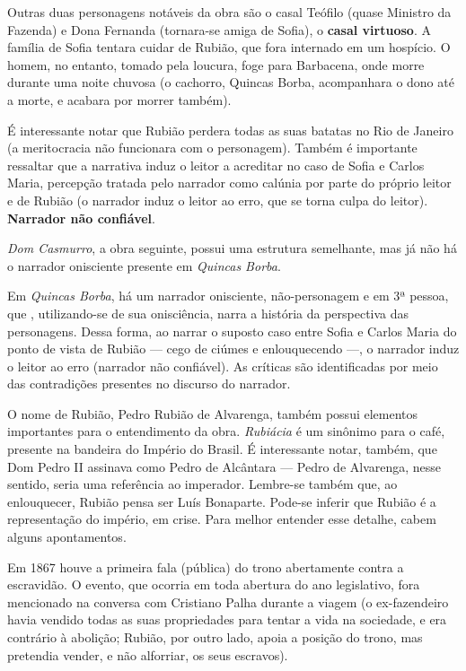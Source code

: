 Outras duas personagens notáveis da obra são o casal Teófilo (quase Ministro da Fazenda) e Dona Fernanda (tornara-se amiga de Sofia), o \textbf{casal virtuoso}. A família de Sofia tentara cuidar de Rubião, que fora internado em um hospício. O homem, no entanto, tomado pela loucura, foge para Barbacena, onde morre durante uma noite chuvosa (o cachorro, Quincas Borba, acompanhara o dono até a morte, e acabara por morrer também).

É interessante notar que Rubião perdera todas as suas batatas no Rio de Janeiro (a meritocracia não funcionara com o personagem). Também é importante ressaltar que a narrativa induz o leitor a acreditar no caso de Sofia e Carlos Maria, percepção tratada pelo narrador como calúnia por parte do próprio leitor e de Rubião (o narrador induz o leitor ao erro, que se torna culpa do leitor). \textbf{Narrador não confiável}.

\textit{Dom Casmurro}, a obra seguinte, possui uma estrutura semelhante, mas já não há o narrador onisciente presente em \textit{Quincas Borba}.

Em \textit{Quincas Borba}, há um narrador onisciente, não-personagem e em 3ª pessoa, que , utilizando-se de sua onisciência, narra a história da perspectiva das personagens. Dessa forma, ao narrar o suposto caso entre Sofia e Carlos Maria do ponto de vista de Rubião — cego de ciúmes e enlouquecendo —, o narrador induz o leitor ao erro (narrador não confiável). As críticas são identificadas por meio das contradições presentes no discurso do narrador.

O nome de Rubião, Pedro Rubião de Alvarenga, também possui elementos importantes para o entendimento da obra. \textit{Rubiácia} é um sinônimo para o café, presente na bandeira do Império do Brasil. É interessante notar, também, que Dom Pedro II assinava como Pedro de Alcântara — Pedro de Alvarenga, nesse sentido, seria uma referência ao imperador. Lembre-se também que, ao enlouquecer, Rubião pensa ser Luís Bonaparte. Pode-se inferir que Rubião é a representação do império, em crise. Para melhor entender esse detalhe, cabem alguns apontamentos.

Em 1867 houve a primeira fala (pública) do trono abertamente contra a escravidão. O evento, que ocorria em toda abertura do ano legislativo, fora mencionado na conversa com Cristiano Palha durante a viagem (o ex-fazendeiro havia vendido todas as suas propriedades para tentar a vida na sociedade, e era contrário à abolição; Rubião, por outro lado, apoia a posição do trono, mas pretendia vender, e não alforriar, os seus escravos).

